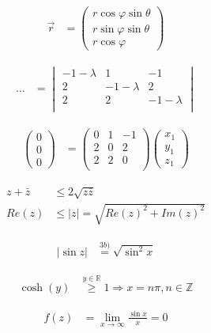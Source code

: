 \documentclass[12pt, a4paper, twopage]{scrartcl}
\begin{document}
\begin{align}
	 \vec{r} &= \left( \begin{matrix}
	 r \cos \varphi \sin \theta\\
	 r \sin \varphi \sin \theta\\
	 r \cos \varphi
	 \end{matrix} \right )
\end{align}


\begin{align}
	 ... &=\begin{vmatrix}
		  -1-\lambda & 1 & -1 \\
		  2 & -1-\lambda & 2\\
		  2 & 2 & -1-\lambda\\
		  \end{vmatrix}
\end{align}


\begin{align}
	 \begin{pmatrix}
	 0\\0\\0
	 \end{pmatrix} &= \begin{pmatrix}
	 0 & 1 & -1 \\
	 2 & 0 & 2\\
	 2 & 2 & 0\\
	 \end{pmatrix} \begin{pmatrix}
	 x_1 \\ y_1\\ z_1
	 \end{pmatrix}
\end{align}


\begin{align}
	 z + \bar{z} &\leq 2\sqrt{z\bar{z}} \tag*{:2} \\\nonumber	 
	 Re(z) &\leq |z| = \sqrt{Re(z)^2 + Im(z)^2} \tag*{$\square$}
\end{align}


\begin{align}
	 |\sin z| &\overset{3b)}= \sqrt{\sin^2 x}
\end{align}


\begin{align}
	 \cosh(y) & \overset{y \in \mathbb{R}} \geq 1 \Rightarrow x = n \pi, n \in \mathbb{Z}
\end{align}
	
	
\begin{align}
	 f(z) &= \lim\limits_{x\rightarrow \infty} \frac{\sin x}{x} = 0
\end{align}
\end{document}
